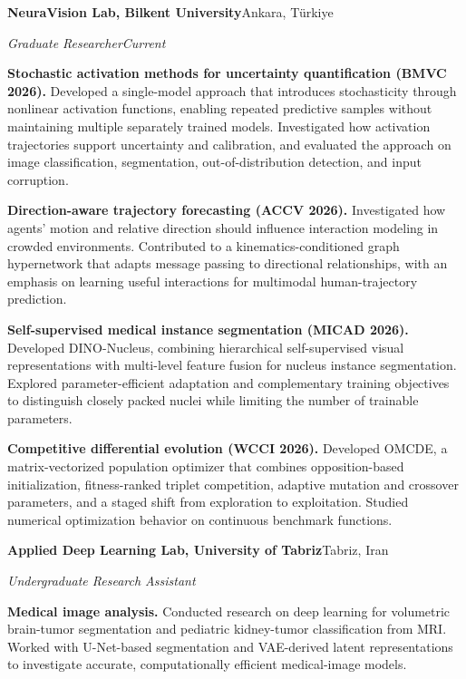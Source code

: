 \documentclass[10pt,a4paper]{article}
\newcommand{\workitem}[2]{%
  \Needspace{4\baselineskip}%
  \textbf{#1} #2\par\vspace{12pt}%
}
\begin{document}
\textbf{NeuraVision Lab, Bilkent University}\hfill Ankara, T\"urkiye\par
\textit{Graduate Researcher}\hfill\textit{Current}\par\vspace{12pt}

\workitem
  {Stochastic activation methods for uncertainty quantification (BMVC 2026).}
  {Developed a single-model approach that introduces stochasticity through nonlinear activation functions, enabling repeated predictive samples without maintaining multiple separately trained models. Investigated how activation trajectories support uncertainty and calibration, and evaluated the approach on image classification, segmentation, out-of-distribution detection, and input corruption.}

\workitem
  {Direction-aware trajectory forecasting (ACCV 2026).}
  {Investigated how agents' motion and relative direction should influence interaction modeling in crowded environments. Contributed to a kinematics-conditioned graph hypernetwork that adapts message passing to directional relationships, with an emphasis on learning useful interactions for multimodal human-trajectory prediction.}

\workitem
  {Self-supervised medical instance segmentation (MICAD 2026).}
  {Developed DINO-Nucleus, combining hierarchical self-supervised visual representations with multi-level feature fusion for nucleus instance segmentation. Explored parameter-efficient adaptation and complementary training objectives to distinguish closely packed nuclei while limiting the number of trainable parameters.}

\workitem
  {Competitive differential evolution (WCCI 2026).}
  {Developed OMCDE, a matrix-vectorized population optimizer that combines opposition-based initialization, fitness-ranked triplet competition, adaptive mutation and crossover parameters, and a staged shift from exploration to exploitation. Studied numerical optimization behavior on continuous benchmark functions.}

\vspace{2pt}
\textbf{Applied Deep Learning Lab, University of Tabriz}\hfill Tabriz, Iran\par
\textit{Undergraduate Research Assistant}\par\vspace{12pt}

\workitem
  {Medical image analysis.}
  {Conducted research on deep learning for volumetric brain-tumor segmentation and pediatric kidney-tumor classification from MRI. Worked with U-Net-based segmentation and VAE-derived latent representations to investigate accurate, computationally efficient medical-image models.}
\end{document}

